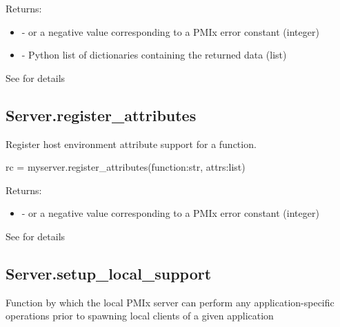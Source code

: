 Returns:

\begin{itemize}
    \item {} -  or a negative value corresponding to a PMIx error constant (integer)
    \item {} - Python list of  dictionaries containing the returned data (list)
\end{itemize}


See  for details


\subsection{Server.register_attributes}

\summary
Register host environment attribute support for a function.

\format

\pyspecificstart
\begin{codepar}
rc = myserver.register_attributes(function:str, attrs:list)
\end{codepar}
\pyspecificend


\begin{arglist}
\end{arglist}

Returns:

\begin{itemize}
    \item {} -  or a negative value corresponding to a PMIx error constant (integer)
\end{itemize}


See  for details


\subsection{Server.setup_local_support}

\summary
Function by which the local \ac{PMIx} server can perform any application-specific operations prior to spawning local clients of a given application

